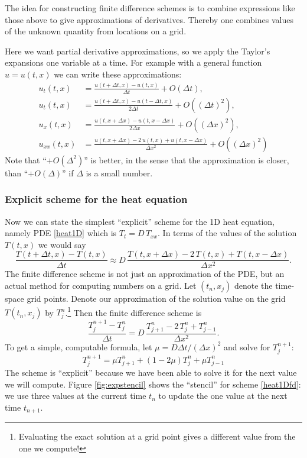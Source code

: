 \documentclass[titlepage,letterpaper,final,12pt]{scrartcl}
\begin{document}
The idea for constructing finite difference schemes is to combine expressions like those above to give approximations of derivatives.  Thereby one combines values of the unknown quantity from  locations on a grid.

Here we want partial derivative approximations, so we apply the Taylor's expansions one variable at a time.  For example with a general function $u=u(t,x)$ we can write these approximations:
\begin{align*}
u_t(t,x) &= \frac{u(t+\Delta t,x) - u(t,x)}{\Delta t} + O(\Delta t), \\
u_t(t,x) &= \frac{u(t+\Delta t,x) - u(t-\Delta t,x)}{2\Delta t} + O((\Delta t)^2), \\
u_x(t,x) &= \frac{u(t,x+\Delta x) - u(t,x-\Delta x)}{2\Delta x} + O((\Delta x)^2), \\
u_{xx}(t,x) &= \frac{u(t,x+\Delta x) - 2\, u(t,x) + u(t,x-\Delta x)}{\Delta x^2} + O((\Delta x)^2)
\end{align*}
Note that ``$+O(\Delta^2)$'' is better, in the sense that the approximation is closer, than ``$+O(\Delta)$'' if $\Delta$ is a small number.

\subsubsection*{Explicit scheme for the heat equation}

Now we can state the simplest ``explicit'' scheme for the 1D heat equation, namely PDE \eqref{heat1D} which is $T_t = D\, T_{xx}$.  In terms of the values of the solution $T(t,x)$ we would say
	$$\frac{T(t+\Delta t,x) - T(t,x)}{\Delta t} \approx D\,\frac{T(t,x+\Delta x) - 2\, T(t,x) + T(t,x-\Delta x)}{\Delta x^2}.$$
The finite difference scheme is not just an approximation of the PDE, but an actual method for computing numbers on a grid.  Let $(t_n,x_j)$ denote the time-space grid points.  Denote our approximation of the solution value on the grid $T(t_n,x_j)$ by $T_j^n$.\footnote{Evaluating the exact solution at a grid point gives a different value from the one we compute!}  Then the finite difference scheme is
	$$\frac{T_j^{n+1} - T_j^n}{\Delta t} = D\,\frac{T_{j+1}^n - 2\, T_j^n + T_{j-1}^n}{\Delta x^2}.$$
To get a simple, computable formula, let $\mu = D \Delta t / (\Delta x)^2$ and solve for $T_j^{n+1}$:
\begin{equation}
  T_j^{n+1} = \mu T_{j+1}^n + (1 - 2 \mu) T_j^n + \mu T_{j-1}^n \label{heat1Dfd}
\end{equation}
The scheme is ``explicit'' because we have been able to solve it for the next value we will compute.  Figure \ref{fig:expstencil} shows the ``stencil'' for scheme \eqref{heat1Dfd}: we use three values at the current time $t_n$ to update the one value at the next time $t_{n+1}$.
\end{document}
